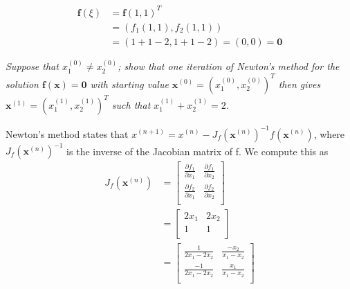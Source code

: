 \begin{align*}
    \mathbf{f}(\xi) &= \mathbf{f}(1, 1)^T \\
        &= (f_1(1, 1), f_2(1,1)) \\
        &= (1 + 1 - 2, 1 + 1 - 2) = (0, 0) = \mathbf{0}
\end{align*}

\textit{Suppose that $x_1^{(0)} \ne x_2^{(0)}$; show that one iteration of Newton's method for the solution $\mathbf{f(x) = 0}$ with starting value $\mathbf{x}^{(0)} = (x_1^{(0)}, x_2^{(0)})^T$ then gives $\mathbf{x}^{(1)} = (x_1^{(1)}, x_2^{(1)})^T$ such that $x_1^{(1)} + x_2^{(1)} = 2$.}

Newton's method states that $x^{(n + 1)} = x^{(n)} - J_f(\mathbf{x}^{(n)})^{-1} f(\mathbf{x}^{(n)})$, where $J_f(\mathbf{x}^{(n)})^{-1}$ is the inverse of the Jacobian matrix of f. We compute this as 
\begin{align*}
    J_f(\mathbf{x}^{(n)}) &=
    \begin{bmatrix}
        \frac{\partial f_1}{\partial x_1} & \frac{\partial f_1}{\partial x_2} \\
        \frac{\partial f_2}{\partial x_1} & 
        \frac{\partial f_2}{\partial x_2} \\
    \end{bmatrix} \\
    &= \begin{bmatrix}
        2x_1 & 2x_2 \\
        1 & 1 \\
    \end{bmatrix} \\
    &= \begin{bmatrix}
        \frac{1}{2x_1 - 2x_2} & \frac{-x_2}{x_1 - x_2} \\
        \frac{-1}{2x_1 - 2x_2} & \frac{x_1}{x_1 - x_2} \\
    \end{bmatrix} \\
\end{align*}

